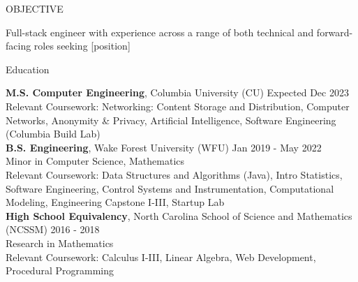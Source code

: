 \documentclass{resume} %
\begin{document}

\begin{rSection}{OBJECTIVE}

{Full-stack engineer with experience across a range of both technical and forward-facing roles seeking [position]}

\end{rSection}

\begin{rSection}{Education}

{\bf M.S. Computer Engineering}, Columbia University (CU) \hfill {Expected Dec 2023}\\
Relevant Coursework: Networking: Content Storage and Distribution, Computer Networks, Anonymity \& Privacy, Artificial Intelligence, Software Engineering (Columbia Build Lab)\\

{\bf B.S. Engineering}, Wake Forest University (WFU) \hfill {Jan 2019 - May 2022}\\
Minor in Computer Science, Mathematics\\
Relevant Coursework: Data Structures and Algorithms (Java), Intro Statistics, Software Engineering, Control Systems and Instrumentation, Computational Modeling, Engineering Capstone I-III, Startup Lab\\

{\bf High School Equivalency}, North Carolina School of Science and Mathematics (NCSSM) \hfill {2016 - 2018}\\ \smallskip
Research in Mathematics  \\
Relevant Coursework: Calculus I-III, Linear Algebra, Web Development, Procedural Programming
\end{rSection}
\end{document}
